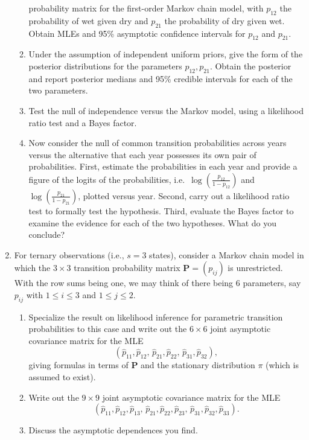 \documentclass{article} %
\begin{document}
\begin{enumerate}
\begin{enumerate}
  probability matrix for the first-order Markov chain model, with
  $p_{12}$
  the probability of wet given dry and $p_{21}$
  the probability of dry given wet.  Obtain MLEs and 95\% asymptotic
  confidence intervals for $p_{12}$ and $p_{21}$.
\item Under the assumption of independent uniform priors, give the
  form of the posterior distributions for the parameters
  $p_{12},p_{21}$. Obtain the posterior and report posterior medians
  and 95\% credible intervals for each of the two parameters.
\item Test the null of independence versus the Markov model, using a likelihood ratio test and a Bayes factor.
\item Now consider the null of common transition probabilities across
  years versus the alternative that each year possesses its own pair
  of probabilities. First, estimate the probabilities in each year and
  provide a figure of the logits of the probabilities,
  i.e.~$\log\left(\frac{p_{12}}{1-p_{12}}\right)$
  and $\log\left(\frac{p_{21}}{1-p_{21}}\right)$,
  plotted versus year. Second, carry out a likelihood ratio test to
  formally test the hypothesis. Third, evaluate the Bayes factor to
  examine the evidence for each of the two hypotheses. What do you
  conclude?
\end{enumerate}
\item For ternary observations (i.e., $s=3$ states), consider a Markov
  chain model in which the $3\times 3$ transition probability matrix
  $\mathbf{P}=(p_{ij})$ is unrestricted.  With the row sums being one,
  we may think of there being 6 parameters, say $p_{ij}$ with $1\le
  i\le 3$ and $1\le j\le 2$.
  \begin{enumerate}
  \item Specialize the result on likelihood inference for parametric
    transition probabilities to this case and write out the $6\times
    6$ joint asymptotic covariance matrix for the MLE
    \[
    \left(\hat p_{11},\hat p_{12},\, \hat p_{21},\hat
      p_{22}, \,\hat p_{31},\hat p_{32}\right),
    \]
    giving formulas in terms of $\mathbf{P}$ and the stationary
    distribution $\pi$ (which is assumed to exist).
  \item Write out the $9\times 9$ joint asymptotic covariance matrix
    for the MLE
    \[
    \left(\hat p_{11},\hat p_{12},\hat p_{13},\, \hat p_{21},\hat
      p_{22},\hat p_{23},\, \hat p_{31},\hat p_{32},\hat p_{33}\right).
    \]
  \item Discuss the asymptotic dependences you find.
  \end{enumerate}
\end{enumerate}
\end{document}
